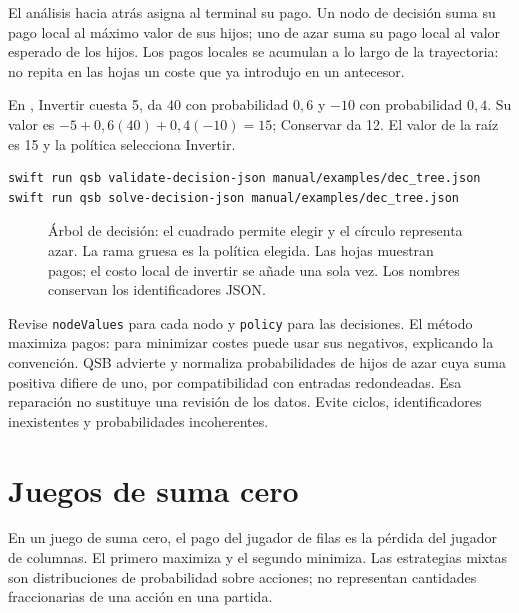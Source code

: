 El análisis hacia atrás asigna al terminal su pago. Un nodo de decisión suma
su pago local al máximo valor de sus hijos; uno de azar suma su pago local al
valor esperado de los hijos. Los pagos locales se acumulan a lo largo de la
trayectoria: no repita en las hojas un coste que ya introdujo en un antecesor.

En , Invertir cuesta 5, da 40 con probabilidad $0{,}6$
y $-10$ con probabilidad $0{,}4$. Su valor es
$-5+0{,}6(40)+0{,}4(-10)=15$; Conservar da 12. El valor de la raíz es 15 y
la política selecciona Invertir.
\begin{lstlisting}
swift run qsb validate-decision-json manual/examples/dec_tree.json
swift run qsb solve-decision-json manual/examples/dec_tree.json
\end{lstlisting}
\begin{figure}[H]
\centering

\caption{Árbol de decisión: el cuadrado permite elegir y el círculo representa azar. La rama gruesa es la política elegida. Las hojas muestran pagos; el costo local de invertir se añade una sola vez. Los nombres conservan los identificadores JSON.}
\label{fig:decision-tree}
\end{figure}

Revise \texttt{nodeValues} para cada nodo y \texttt{policy} para las decisiones.
El método maximiza pagos: para minimizar costes puede usar sus negativos,
explicando la convención. QSB advierte y normaliza probabilidades de hijos de
azar cuya suma positiva difiere de uno, por compatibilidad con entradas
redondeadas. Esa reparación no sustituye una revisión de los datos. Evite
ciclos, identificadores inexistentes y probabilidades incoherentes.

\section{Juegos de suma cero}
En un juego de suma cero, el pago del jugador de filas es la pérdida del jugador
de columnas. El primero maximiza y el segundo minimiza. Las estrategias mixtas
son distribuciones de probabilidad sobre acciones; no representan cantidades
fraccionarias de una acción en una partida.

